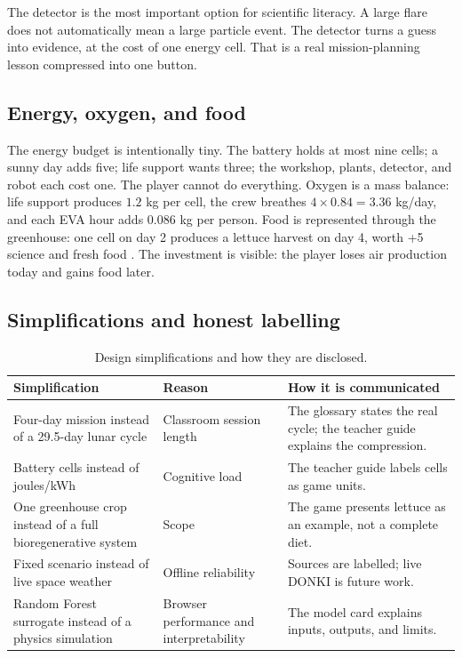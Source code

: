 \documentclass[11pt,a4paper]{article}
\begin{document}
The detector is the most important option for scientific literacy. A large flare does not automatically mean a large particle event. The detector turns a guess into evidence, at the cost of one energy cell. That is a real mission-planning lesson compressed into one button.

\subsection{Energy, oxygen, and food}

The energy budget is intentionally tiny. The battery holds at most nine cells; a sunny day adds five; life support wants three; the workshop, plants, detector, and robot each cost one. The player cannot do everything. Oxygen is a mass balance: life support produces $1.2$ kg per cell, the crew breathes $4 \times 0.84 = 3.36$ kg/day, and each EVA hour adds $0.086$ kg per person. Food is represented through the greenhouse: one cell on day 2 produces a lettuce harvest on day 4, worth +5 science and fresh food \cite{douglas2020,khodadad2020}. The investment is visible: the player loses air production today and gains food later.

\subsection{Simplifications and honest labelling}

\begin{table}[H]
\centering
\small
\begin{tabular}{@{}p{4.2cm}p{4.0cm}p{5.8cm}@{}}
\toprule
\textbf{Simplification} & \textbf{Reason} & \textbf{How it is communicated}\\
\midrule
Four-day mission instead of a 29.5-day lunar cycle & Classroom session length & The glossary states the real cycle; the teacher guide explains the compression.\\
Battery cells instead of joules/kWh & Cognitive load & The teacher guide labels cells as game units.\\
One greenhouse crop instead of a full bioregenerative system & Scope & The game presents lettuce as an example, not a complete diet.\\
Fixed scenario instead of live space weather & Offline reliability & Sources are labelled; live DONKI is future work.\\
Random Forest surrogate instead of a physics simulation & Browser performance and interpretability & The model card explains inputs, outputs, and limits.\\
\bottomrule
\end{tabular}
\caption{Design simplifications and how they are disclosed.}
\label{tab:simplifications}
\end{table}
\end{document}
